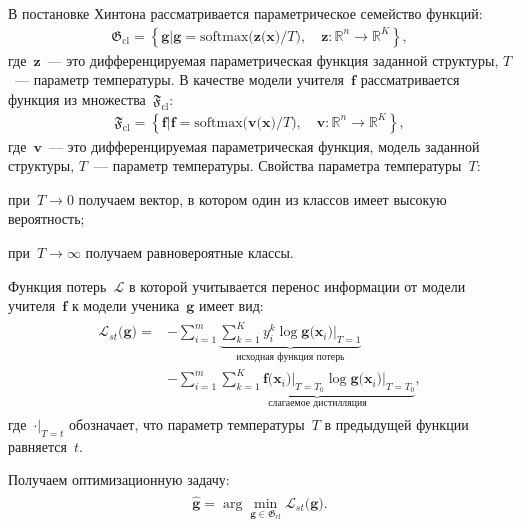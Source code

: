 \documentclass[12pt]{a&t}
\begin{document}
В постановке Хинтона рассматривается параметрическое семейство функций:
\begin{gather}
\label{eq:G:set:cl}
\mathfrak{G}_{\text{cl}} = \left\{\mathbf{g}| \mathbf{g} = \text{softmax}\bigr(\mathbf{z}\bigr(\mathbf{x}\bigr)/T\bigr), \quad \mathbf{z}: \mathbb{R}^n \to \mathbb{R}^K \right\},
\end{gather}
где~$\mathbf{z}$~--- это дифференцируемая параметрическая функция заданной структуры, $T$~--- параметр температуры. В качестве модели учителя~$\mathbf{f}$ рассматривается функция из множества~$\mathfrak{F}_{\text{cl}}$:
\begin{gather}
\label{eq:F:set:cl}
\mathfrak{F}_{\text{cl}} = \left\{\mathbf{f}| \mathbf{f} = \text{softmax}\bigr(\mathbf{v}\bigr(\mathbf{x}\bigr)/T\bigr), \quad \mathbf{v}: \mathbb{R}^n \to \mathbb{R}^K \right\},
\end{gather}
где~$\mathbf{v}$~--- это дифференцируемая параметрическая функция, модель заданной структуры, $T$~--- параметр температуры.
Свойства параметра температуры~$T$:
\begin{enumlist}
    \item при~$T\to 0$ получаем вектор, в котором один из классов имеет высокую вероятность;
    \item при~$T\to \infty$ получаем равновероятные классы.
\end{enumlist}

Функция потерь~$\mathcal{L}$ в которой учитывается перенос информации от модели учителя~$\mathbf{f}$ к модели ученика~$\mathbf{g}$ имеет вид:
\begin{gather}
\label{eq:hinton:1}
\begin{aligned}
   \mathcal{L}_{st}\bigr(\mathbf{g}\bigr) = &-\sum_{i=1}^{m}\underbrace{{\sum_{k=1}^{K}y^k_i\log\mathbf{g}\bigr(\mathbf{x}_i\bigr)\bigr|_{T=1}}}_{\text{исходная функция потерь}}\\
   &-\sum_{i=1}^{m}\underbrace{{\sum_{k=1}^{K}\mathbf{f}\bigr(\mathbf{x}_i\bigr)\bigr|_{T=T_0}\log\mathbf{g}\bigr(\mathbf{x}_i\bigr)\bigr|_{T=T_0}}}_{\text{слагаемое дистилляция}},
\end{aligned}
\end{gather}
где~$\cdot\bigr|_{T=t}$ обозначает, что параметр температуры~$T$ в предыдущей функции равняется~$t$.

Получаем оптимизационную задачу:
\begin{gather}
\label{eq:hinton:opt}
\begin{aligned}
   \hat{\mathbf{g}} = \arg\min_{\mathbf{g} \in \mathfrak{G}_{\text{cl}}} \mathcal{L}_{st}\bigr(\mathbf{g}\bigr).
\end{aligned}
\end{gather}
\end{document}
